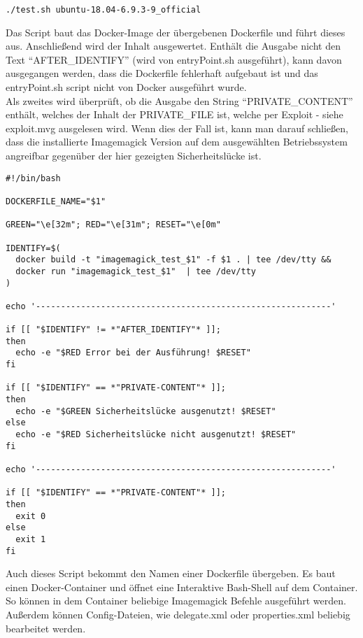 \begin{lstlisting}[language=Text, caption=Beispielaufruf test.sh,label={lst:testsuitecall}]
./test.sh ubuntu-18.04-6.9.3-9_official
\end{lstlisting}
\vspace{5mm}

Das Script baut das Docker-Image der übergebenen Dockerfile und führt dieses aus.
Anschließend wird der Inhalt ausgewertet.
Enthält die Ausgabe nicht den Text "`AFTER\_IDENTIFY"'
(wird von entryPoint.sh ausgeführt), kann davon ausgegangen werden,
dass die Dockerfile fehlerhaft aufgebaut ist und das entryPoint.sh script nicht von Docker ausgeführt wurde.\\

Als zweites wird überprüft, ob die Ausgabe den String "`PRIVATE\_CONTENT"' enthält,
welches der Inhalt der PRIVATE\_FILE ist,
welche per Exploit - siehe exploit.mvg ausgelesen wird.
Wenn dies der Fall ist, kann man darauf schließen, dass die installierte Imagemagick Version
auf dem ausgewählten Betriebssystem angreifbar gegenüber der hier gezeigten Sicherheitslücke ist.

\begin{lstlisting}[language=Text, caption=test.sh Script in Testsuite,label={lst:testsuitetestscript}]
#!/bin/bash

DOCKERFILE_NAME="$1"

GREEN="\e[32m"; RED="\e[31m"; RESET="\e[0m"

IDENTIFY=$(
  docker build -t "imagemagick_test_$1" -f $1 . | tee /dev/tty &&
  docker run "imagemagick_test_$1"  | tee /dev/tty
)

echo '-----------------------------------------------------------'

if [[ "$IDENTIFY" != *"AFTER_IDENTIFY"* ]];
then
  echo -e "$RED Error bei der Ausführung! $RESET"
fi

if [[ "$IDENTIFY" == *"PRIVATE-CONTENT"* ]];
then
  echo -e "$GREEN Sicherheitslücke ausgenutzt! $RESET"
else
  echo -e "$RED Sicherheitslücke nicht ausgenutzt! $RESET"
fi

echo '-----------------------------------------------------------'

if [[ "$IDENTIFY" == *"PRIVATE-CONTENT"* ]];
then
  exit 0
else
  exit 1
fi
\end{lstlisting}
\vspace{5mm}



Auch dieses Script bekommt den Namen einer Dockerfile übergeben.
Es baut einen Docker-Container und öffnet eine Interaktive Bash-Shell auf dem Container.
So können in dem Container beliebige Imagemagick Befehle ausgeführt werden.
Außerdem können Config-Dateien, wie delegate.xml oder properties.xml beliebig bearbeitet werden.

